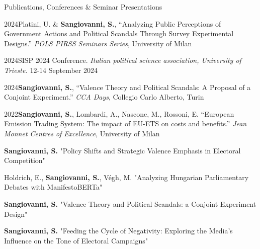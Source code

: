 \documentclass{cv} %
\begin{document}
\begin{rSection}{Publications, Conferences \& Seminar Presentations}
\subtitle{Conferences \& Seminar Presentations}

\begin{rPresSection}{2024}{Platini, U. \& \textbf{Sangiovanni, S.}, “Analyzing Public Perceptions of Government Actions and Political Scandals Through Survey Experimental Designs.” \textit{POLS PIRSS Seminars Series}, University of Milan}
\end{rPresSection}
\begin{rPresSection}{2024}{SISP 2024 Conference. \textit{Italian political science association, University of Trieste.} 12-14 September 2024}
\end{rPresSection}
\begin{rPresSection}{2024}{\textbf{Sangiovanni, S.}, “Valence Theory and Political Scandals: A Proposal of a Conjoint Experiment.” \textit{CCA Days}, Collegio Carlo Alberto, Turin}
\end{rPresSection}
\begin{rPresSection}{2022}{\textbf{Sangiovanni, S.}, Lombardi, A., Nascone, M., Rossoni, E. “European Emission Trading System: The impact of EU-ETS on costs and benefits.” \textit{Jean Monnet Centres of Excellence}, University of Milan}
\end{rPresSection}

\subtitle{Working Papers}

\begin{rWPSection}    
{\textbf{Sangiovanni, S.} "Policy Shifts and Strategic Valence Emphasis in Electoral Competition"} 
\end{rWPSection}
\begin{rWPSection}    
{Holdrich, E., \textbf{Sangiovanni, S.}, Végh, M. "Analyzing Hungarian Parliamentary Debates with ManifestoBERTa"} 
\end{rWPSection}
\begin{rWPSection}
{\textbf{Sangiovanni, S.} "Valence Theory and Political Scandals: a Conjoint Experiment Design"} 
\end{rWPSection}
\begin{rWPSection}
{\textbf{Sangiovanni, S.} "Feeding the Cycle of Negativity: Exploring the Media's Influence on the Tone of Electoral Campaigns"}
\end{rWPSection}
\end{rSection}
\end{document}

